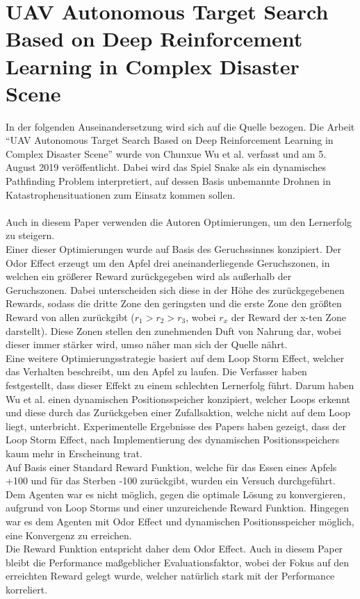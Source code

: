 \section{UAV Autonomous Target Search Based on Deep Reinforcement Learning in Complex Disaster Scene} \label{sec:Verwandte_Arbeiten_Paper_2}
In der folgenden Auseinandersetzung wird sich auf die Quelle \cite{UAV} bezogen.
Die Arbeit "`UAV Autonomous Target Search Based on Deep Reinforcement Learning in Complex Disaster Scene"' wurde von Chunxue Wu et al. verfasst und am 5. August 2019 veröffentlicht. Dabei wird das Spiel Snake als ein dynamisches Pathfinding Problem interpretiert, auf dessen Basis unbemannte Drohnen in Katastrophensituationen zum Einsatz kommen sollen.\\
\\Auch in diesem Paper verwenden die Autoren Optimierungen, um den Lernerfolg zu steigern.\\
Einer dieser Optimierungen wurde auf Basis des Geruchssinnes konzipiert. Der Odor Effect erzeugt um den Apfel drei aneinanderliegende Geruchszonen, in welchen ein größerer Reward zurückgegeben wird als außerhalb der Geruchszonen. Dabei unterscheiden sich diese in der Höhe des zurückgegebenen Rewards, sodass die dritte Zone den geringsten und die erste Zone den größten Reward von allen zurückgibt ($r_1 > r_2 > r_3$, wobei $r_x$ der Reward der x-ten Zone darstellt).
Diese Zonen stellen den zunehmenden Duft von Nahrung dar, wobei dieser immer stärker wird, umso näher man sich der Quelle nährt.\\
Eine weitere Optimierungsstrategie basiert auf dem Loop Storm Effect, welcher das Verhalten beschreibt, um den Apfel zu laufen. Die Verfasser haben festgestellt, dass dieser Effekt zu einem schlechten Lernerfolg führt. Darum haben Wu et al. einen dynamischen Positionsspeicher konzipiert, welcher Loops erkennt und diese durch das Zurückgeben einer Zufallsaktion, welche nicht auf dem Loop liegt, unterbricht. Experimentelle Ergebnisse des Papers haben gezeigt, dass der Loop Storm Effect, nach Implementierung des dynamischen Positionsspeichers kaum mehr in Erscheinung trat.\\
Auf Basis einer Standard Reward Funktion, welche für das Essen eines Apfels +100 und für das Sterben -100 zurückgibt, wurden ein Versuch durchgeführt. Dem Agenten war es nicht möglich, gegen die optimale Lösung zu konvergieren, aufgrund von Loop Storms und einer unzureichende Reward Funktion. Hingegen war es dem Agenten mit Odor Effect und dynamischen Positionsspeicher möglich, eine Konvergenz zu erreichen.\\
Die Reward Funktion entspricht daher dem Odor Effect.
Auch in diesem Paper bleibt die Performance maßgeblicher Evaluationsfaktor, wobei der Fokus auf den erreichten Reward gelegt wurde, welcher natürlich stark mit der Performance korreliert.


